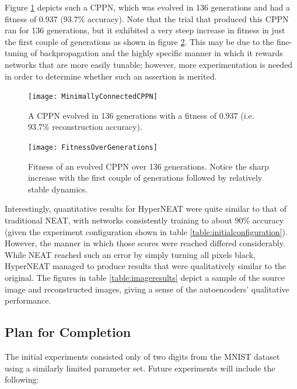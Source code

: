 \documentclass{acm_proc_article-sp}
\begin{document}
Figure \ref{figure:minimallyconnectedcppn} depicts such a CPPN, which was evolved in 136 generations and had a fitness of 0.937 (93.7\% accuracy).  Note that the trial that produced this CPPN ran for 136 generations, but it exhibited a very steep increase in fitness in just the first couple of generations as shown in figure \ref{figure:fitnessovergenerations}.  This may be due to the fine-tuning of backpropagation and the highly specific manner in which it rewards networks that are more easily tunable; however, more experimentation is needed in order to determine whether such an assertion is merited.

\begin{figure}[h]
	\caption{A CPPN evolved in 136 generations with a fitness of 0.937 (i.e. 93.7\% reconstruction accuracy).}
	\centering
	\texttt{[image: MinimallyConnectedCPPN]}
	\label{figure:minimallyconnectedcppn}
\end{figure}

\begin{figure}[h]
	\caption{Fitness of an evolved CPPN over 136 generations.  Notice the sharp increase with the first couple of generations followed by relatively stable dynamics.}
	\centering
	\texttt{[image: FitnessOverGenerations]}
	\label{figure:fitnessovergenerations}
\end{figure}

Interestingly, quantitative results for HyperNEAT were quite similar to that of traditional NEAT, with networks consistently training to about 90\% accuracy (given the experiment configuration shown in table \ref{table:initialconfiguration}). However, the manner in which those scores were reached differed considerably.  While NEAT reached such an error by simply turning all pixels black, HyperNEAT managed to produce results that were qualitatively similar to the original.  The figures in table \ref{table:imageresults} depict a sample of the source image and reconstructed images, giving a sense of the autoencoders' qualitative performance.

\subsection{Plan for Completion}

The initial experiments consisted only of two digits from the MNIST dataset using a similarly limited parameter set.  Future experiments will include the following:
\end{document}
